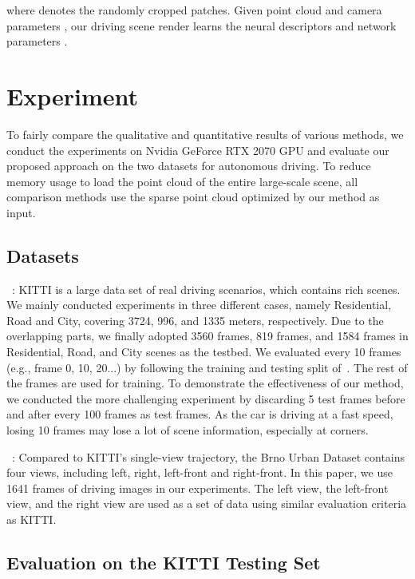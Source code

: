 \documentclass[sigconf]{acmart}
\begin{document}
where  denotes the randomly cropped patches. Given point cloud  and camera parameters , our driving scene render  learns the neural descriptors  and network parameters . 




\section{Experiment}
To fairly compare the qualitative and quantitative results of various methods, we conduct the experiments on Nvidia GeForce RTX 2070 GPU and evaluate our proposed approach on the two datasets for autonomous driving. To reduce memory usage to load the point cloud of the entire large-scale scene, all comparison methods use the sparse point cloud optimized by our method as input.


\subsection{Datasets}


~\cite{geiger2012we}: KITTI is a large data set of real driving scenarios, which contains rich scenes. We mainly conducted experiments in three different cases, namely Residential, Road and City, covering 3724, 996, and 1335 meters, respectively. Due to the overlapping parts, we finally adopted 3560 frames, 819 frames, and 1584 frames in Residential, Road, and City scenes as the testbed. We evaluated every 10 frames (e.g., frame 0, 10, 20...) by following the training and testing split of~\cite{aliev2020neural,ruckert2021adop}. The rest of the frames are used for training. To demonstrate the effectiveness of our method, we conducted the more challenging experiment by discarding 5 test frames before and after every 100 frames as test frames. As the car is driving at a fast speed, losing 10 frames may lose a lot of scene information, especially at corners.



~\cite{ligocki2020brno}: Compared to KITTI's single-view trajectory, the Brno Urban Dataset contains four views, including left, right, left-front and right-front. In this paper, we use 1641 frames of driving images in our experiments. The left view, the left-front view, and the right view are used as a set of data using similar evaluation criteria as KITTI.



\subsection{Evaluation on the KITTI Testing Set}
\end{document}
